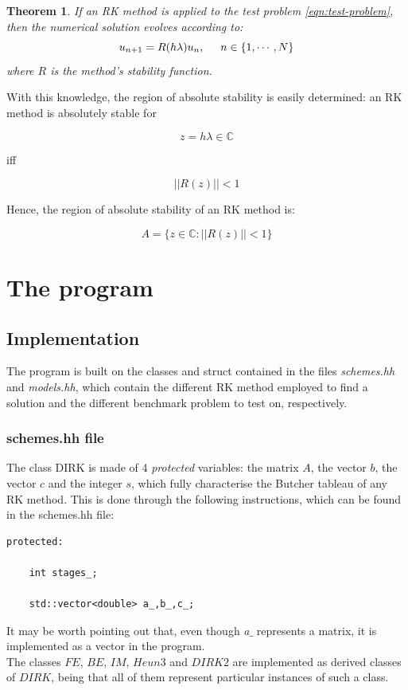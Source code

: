 \documentclass[11pt]{article}
\theoremstyle{theorem}
\newtheorem{theorem}{Theorem}
\theoremstyle{definition}
\begin{document}
\begin{theorem}
	\label{thhm:sol-evol-RK}
	If an RK method is applied to the test problem \eqref{eqn:test-problem}, then the numerical solution evolves according to:
	$$u_{n+1}=R(h\lambda)u_n,\hspace{5mm}n\in\lbrace1,\cdots,N\rbrace$$
	where $R$ is the method's stability function.\\
\end{theorem}

With this knowledge, the region of absolute stability is easily determined: an RK
method is absolutely stable for

$$ z=h\lambda\in\mathbb{C} $$

iff

$$||R(z)||<1$$

Hence, the region of absolute stability of an RK method is:

$$A=\lbrace z\in\mathbb{C}:||R(z)||<1\rbrace$$


\section{The program}
\subsection{Implementation}
The program is built on the classes and struct contained in the files \emph{schemes.hh} and \emph{models.hh}, which contain the different RK method employed to find a solution and the different benchmark problem to test on, respectively.\\
\subsubsection{schemes.hh file}
\label{subsubsec:schemes}
The class DIRK is made of 4 \emph{protected} variables: the matrix $A$, the vector $b$, the vector $c$ and the integer $s$, which fully characterise the Butcher tableau of any RK method. This is done through the following instructions, which can be found in the schemes.hh file:

\begin{lstlisting}
protected:

	int stages_;

	std::vector<double> a_,b_,c_;
\end{lstlisting}

It may be worth pointing out that, even though \emph{a$\_$} represents a matrix, it is implemented as a vector in the program.\\
The classes $FE$, $BE$, $IM$, $Heun3$ and $DIRK2$ are implemented as derived classes of $DIRK$, being that all of them represent particular instances of such a class.\\
\end{document}

